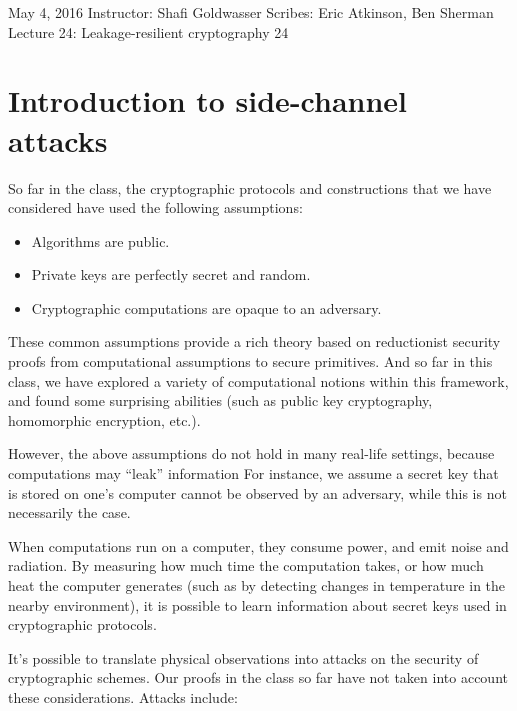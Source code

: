\documentclass[10pt]{article}
\newcommand{\scribes}{Eric Atkinson, Ben Sherman}
\newcommand{\lecnumber}{24}
\newcommand{\lectitle}{Leakage-resilient cryptography}
\newcommand{\thedate}{May 4, 2016}
\begin{document}


{\thedate}
{Instructor: Shafi Goldwasser}
{Scribes: \scribes}
{Lecture \lecnumber: \lectitle}
{\lecnumber}

\section{Introduction to side-channel attacks}

So far in the class, the cryptographic protocols and constructions that we have considered have used the following assumptions:
\begin{itemize}
\item Algorithms are public.
\item Private keys are perfectly secret and random.
\item Cryptographic computations are opaque to an adversary.
\end{itemize}

These common assumptions provide a rich theory based on reductionist security proofs from computational assumptions to secure primitives. And so far in this class, we have explored a variety of computational notions within this framework, and found some surprising abilities (such as public key cryptography, homomorphic encryption, etc.).

However, the above assumptions do not hold in many real-life settings, because computations may ``leak'' information
For instance, we assume a secret key that is stored on one's computer cannot be observed by an adversary, while this is not necessarily the case.

When computations run on a computer, they consume power, and emit noise and radiation. By measuring how much time the computation takes, or how much heat the computer generates (such as by detecting changes in temperature in the nearby environment), it is possible to learn information about secret keys used in cryptographic protocols. 

It's possible to translate physical observations into attacks on the security of cryptographic schemes. Our proofs in the class so far have not taken into account these considerations. Attacks include:
\end{document}
